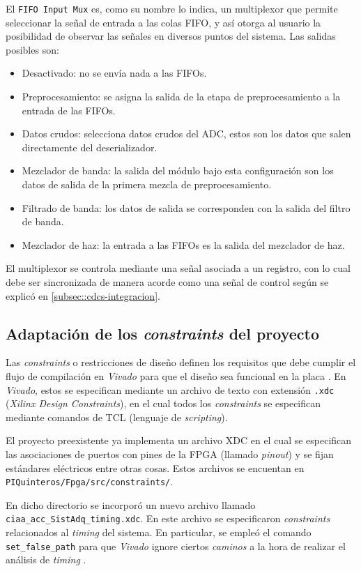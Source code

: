 \documentclass[../../main.tex]{subfiles}
\begin{document}
El \texttt{FIFO Input Mux} es, como su nombre lo indica, un multiplexor que permite seleccionar la señal de entrada a las colas FIFO, y así otorga al usuario la posibilidad de observar las señales en diversos puntos del sistema. Las salidas posibles son:
\begin{itemize}
    \item Desactivado: no se envía nada a las FIFOs.
    \item Preprocesamiento: se asigna la salida de la etapa de preprocesamiento a la entrada de las FIFOs.
    \item Datos crudos: selecciona datos crudos del ADC, estos son los datos que salen directamente del deserializador.
    \item Mezclador de banda: la salida del módulo bajo esta configuración son los datos de salida de la primera mezcla de preprocesamiento.
    \item Filtrado de banda: los datos de salida se corresponden con la salida del filtro de banda.
    \item Mezclador de haz: la entrada a las FIFOs es la salida del mezclador de haz.
\end{itemize}
El multiplexor se controla mediante una señal asociada a un registro, con lo cual debe ser sincronizada de manera acorde como una señal de control según se explicó en \ref{subsec::cdcs-integracion}.

\subsection{Adaptación de los \textit{constraints} del proyecto}
Las \textit{constraints} o restricciones de diseño definen los requisitos que debe cumplir el flujo de compilación en \textit{Vivado} para que el diseño sea funcional en la placa \cite{xdc-constraints}. En \textit{Vivado}, estos se especifican mediante un archivo de texto con extensión \texttt{.xdc} (\textit{Xilinx Design Constraints}), en el cual todos los \textit{constraints} se especifican mediante comandos de TCL (lenguaje de \textit{scripting}).

El proyecto preexistente ya implementa un archivo XDC en el cual se especifican las asociaciones de puertos con pines de la FPGA (llamado \textit{pinout}) y se fijan estándares eléctricos entre otras cosas. Estos archivos se encuentan en \texttt{PIQuinteros/Fpga/src/constraints/}.

En dicho directorio se incorporó un nuevo archivo llamado \texttt{ciaa\_acc\_SistAdq\_timing.xdc}. En este archivo se especificaron \textit{constraints} relacionados al \textit{timing} del sistema. En particular, se empleó el comando \texttt{set\_false\_path} para que \textit{Vivado} ignore ciertos \textit{caminos} a la hora de realizar el análisis de \textit{timing} \cite{false-paths}.
\end{document}
